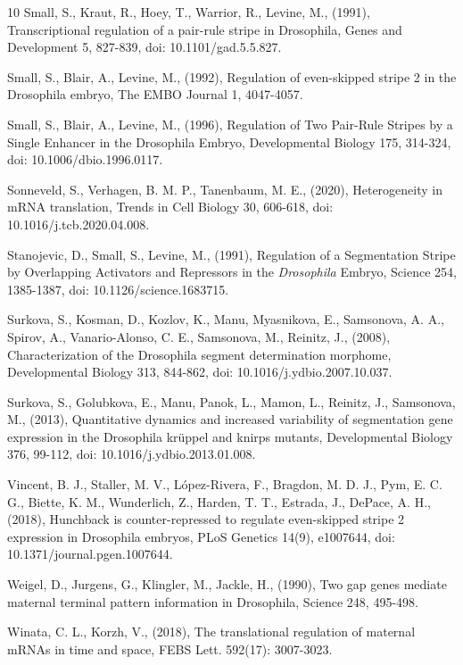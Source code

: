 \documentclass[final,authoryear, 5p, times]{elsarticle}
\begin{document}
\begin{thebibliography}{10}
   Small, S.,   Kraut, R.,  Hoey, T.,  Warrior, R.,  Levine, M., (1991),  Transcriptional regulation of a pair-rule stripe in Drosophila, Genes and Development 5, 827-839, doi: 10.1101/gad.5.5.827.

   Small, S.,  Blair, A.,   Levine, M., (1992),  Regulation of even-skipped stripe 2 in the Drosophila embryo, The EMBO Journal 1, 4047-4057.

  Small, S.,  Blair, A.,   Levine, M., (1996),  Regulation of Two Pair-Rule Stripes by a Single Enhancer in the Drosophila Embryo, Developmental Biology 175, 314-324, doi: 10.1006/dbio.1996.0117.

   Sonneveld, S., Verhagen, B. M. P.,  Tanenbaum, M. E., (2020),  Heterogeneity in mRNA translation, Trends in Cell Biology 30, 606-618, doi: 10.1016/j.tcb.2020.04.008.

  Stanojevic, D.,  Small, S.,   Levine, M., (1991),  Regulation of a Segmentation Stripe by Overlapping Activators and Repressors in the \textit{Drosophila} Embryo, Science 254, 1385-1387, doi: 10.1126/science.1683715.

   Surkova, S.,  Kosman, D.,  Kozlov, K.,  Manu,  Myasnikova, E.,  Samsonova, A. A.,  Spirov, A.,   Vanario-Alonso, C. E.,   Samsonova, M.,   Reinitz, J., (2008),  Characterization of the Drosophila segment determination morphome,   Developmental Biology 313, 844-862, doi: 10.1016/j.ydbio.2007.10.037.

   Surkova, S.,   Golubkova, E.,  Manu,  Panok, L.,   Mamon, L.,   Reinitz, J.,    Samsonova, M., (2013),  Quantitative dynamics and increased variability of segmentation gene expression in the Drosophila krüppel and knirps mutants, Developmental Biology 376, 99-112, doi: 10.1016/j.ydbio.2013.01.008.

  Vincent, B. J.,   Staller, M. V.,  L{\'o}pez-Rivera, F.,   Bragdon, M. D. J.,  Pym, E. C. G.,  Biette, K. M.,  Wunderlich, Z.,  Harden, T. T., Estrada, J.,  DePace,  A. H., (2018), Hunchback is counter-repressed to regulate even-skipped stripe 2 expression in Drosophila embryos, PLoS Genetics 14(9), e1007644, doi: 10.1371/journal.pgen.1007644.

  Weigel, D.,   Jurgens, G.,   Klingler, M.,  Jackle, H., (1990), Two gap genes mediate maternal terminal pattern information in Drosophila, Science 248, 495-498.

 Winata, C. L., Korzh, V., (2018), The translational regulation of maternal mRNAs in time and space, FEBS Lett.  592(17): 3007-3023.

\end{thebibliography}
\end{document}
